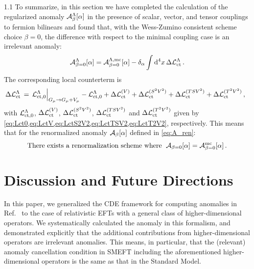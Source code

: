 \documentclass[a4paper,12pt]{article}
\def\L{{\cal L}}
\def\Acal{{\cal A}}
\begin{document}
\begin{spacing}{1.1}
To summarize, in this section we have completed the calculation of the regularized anomaly $\Acal_\beta^\Lambda [\alpha]$ in the presence of scalar, vector, and tensor couplings to fermion bilinears and found that, with the Wess-Zumino consistent scheme choice $\beta=0$, the difference with respect to the minimal coupling case is an irrelevant anomaly:
\begin{equation}
\Acal_{\beta=0}^\Lambda[\alpha] = \Acal_{\beta=0}^{\Lambda,\text{mc}}[\alpha] - \delta_\alpha \int \dd^4x\, \Delta\L_\text{ct}^\Lambda \,.
\end{equation}
The corresponding local counterterm is
\begin{equation}
\Delta\L_\text{ct}^\Lambda \,=\, \L_{\text{ct},0}^\Lambda\Bigr|_{G_\mu\to G_\mu+V_\mu} - \L_{\text{ct},0}^\Lambda + \Delta\L_{\text{ct}}^{(V)} + \Delta\L_\text{ct}^{(S^2V^2)} + \Delta\L_\text{ct}^{(TSV^2)} + \Delta\L_\text{ct}^{(T^2V^2)} \,,\;\;
\end{equation}
with $\L_{\text{ct},0}^\Lambda$, $\Delta\L_{\text{ct}}^{(V)}$, $\Delta\L_\text{ct}^{(S^2V^2)}$, $\Delta\L_\text{ct}^{(TSV^2)}$ and $\Delta\L_\text{ct}^{(T^2V^2)}$ given by \cref{eq:Lct0,eq:LctV,eq:LctS2V2,eq:LctTSV2,eq:LctT2V2}, respectively. This means that for the renormalized anomaly $\Acal_\beta[\alpha]$ defined in \cref{eq:A_ren}:
\begin{equation}
\text{There exists a renormalization scheme where }\;
\Acal_{\beta=0}[\alpha] = \Acal_{\beta=0}^{\text{mc}}[\alpha] \,.
\end{equation}



\section{Discussion and Future Directions}
\label{sec:Discussion}

In this paper, we generalized the CDE framework for computing anomalies in Ref.~\cite{Paper1} to the case of relativistic EFTs with a general class of higher-dimensional operators. We systematically calculated the anomaly in this formalism, and demonstrated explicitly that the additional contributions from higher-dimensional operators are irrelevant anomalies. This means, in particular, that the (relevant) anomaly cancellation condition in SMEFT including the aforementioned higher-dimensional operators is the same as that in the Standard Model.


\end{spacing}
\end{document}
